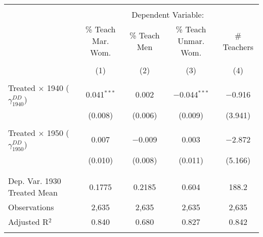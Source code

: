 
\begin{tabular}{@{\extracolsep{5pt}}lcccc} 
\\[-1.8ex]\hline 
\hline \\[-1.8ex] 
 & \multicolumn{4}{c}{Dependent Variable:} \\ 
\cline{2-5} 
 & \% Teach Mar. Wom. & \% Teach Men & \% Teach Unmar. Wom. & \# Teachers \\ 
\\[-1.8ex] & (1) & (2) & (3) & (4)\\ 
\hline \\[-1.8ex] 
 Treated $\times$ 1940 ($\gamma_{1940}^{DD}$) & 0.041$^{***}$ & 0.002 & $-$0.044$^{***}$ & $-$0.916 \\ 
  & (0.008) & (0.006) & (0.009) & (3.941) \\ 
  & & & & \\ 
 Treated $\times$ 1950 ($\gamma_{1950}^{DD}$) & 0.007 & $-$0.009 & 0.003 & $-$2.872 \\ 
  & (0.010) & (0.008) & (0.011) & (5.166) \\ 
  & & & & \\ 
\hline \\[-1.8ex] 
Dep. Var. 1930 Treated Mean & 0.1775 & 0.2185 & 0.604 & 188.2 \\ 
Observations & 2,635 & 2,635 & 2,635 & 2,635 \\ 
Adjusted R$^{2}$ & 0.840 & 0.680 & 0.827 & 0.842 \\ 
\hline 
\hline \\[-1.8ex] 
\end{tabular} 
